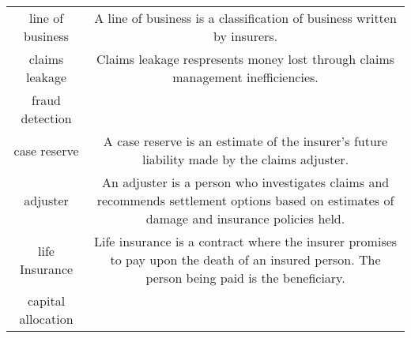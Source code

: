 \documentclass[]{book}
\theoremstyle{definition}
\theoremstyle{definition}
\theoremstyle{definition}
\theoremstyle{remark}
\begin{document}
\begin{longtable}[]{@{}cc@{}}
\begin{minipage}[t]{0.39\columnwidth}
line of business\strut
\end{minipage} & \begin{minipage}[t]{0.42\columnwidth}\centering\strut
A line of business is a classification of business written by
insurers.\strut
\end{minipage}\tabularnewline
\begin{minipage}[t]{0.39\columnwidth}\centering\strut
claims leakage\strut
\end{minipage} & \begin{minipage}[t]{0.42\columnwidth}\centering\strut
Claims leakage respresents money lost through claims management
inefficiencies.\strut
\end{minipage}\tabularnewline
\begin{minipage}[t]{0.39\columnwidth}\centering\strut
fraud detection\strut
\end{minipage} & \begin{minipage}[t]{0.42\columnwidth}\centering\strut
\strut
\end{minipage}\tabularnewline
\begin{minipage}[t]{0.39\columnwidth}\centering\strut
case reserve\strut
\end{minipage} & \begin{minipage}[t]{0.42\columnwidth}\centering\strut
A case reserve is an estimate of the insurer's future liability made by
the claims adjuster.\strut
\end{minipage}\tabularnewline
\begin{minipage}[t]{0.39\columnwidth}\centering\strut
adjuster\strut
\end{minipage} & \begin{minipage}[t]{0.42\columnwidth}\centering\strut
An adjuster is a person who investigates claims and recommends
settlement options based on estimates of damage and insurance policies
held.\strut
\end{minipage}\tabularnewline
\begin{minipage}[t]{0.39\columnwidth}\centering\strut
life Insurance\strut
\end{minipage} & \begin{minipage}[t]{0.42\columnwidth}\centering\strut
Life insurance is a contract where the insurer promises to pay upon the
death of an insured person. The person being paid is the
beneficiary.\strut
\end{minipage}\tabularnewline
\begin{minipage}[t]{0.39\columnwidth}\centering\strut
capital allocation\strut
\end{minipage} & \begin{minipage}[t]{0.42\columnwidth}\centering\strut
\strut
\end{minipage}\tabularnewline
\bottomrule
\end{longtable}
\end{document}
